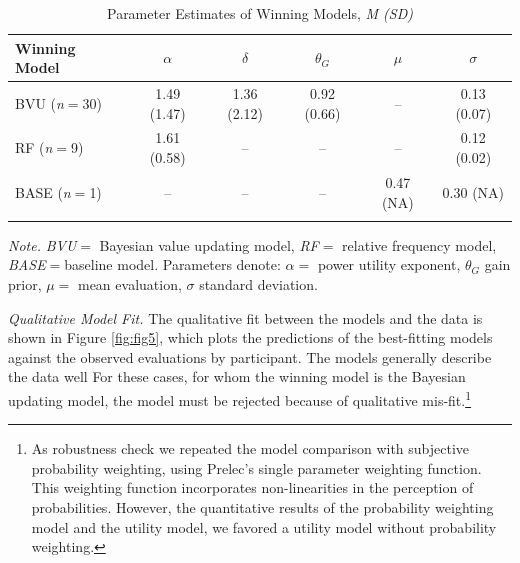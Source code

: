 \documentclass[a4paper, man, floatsintext]{apa6}
\let\rmarkdownfootnote\footnote%
\def\footnote{\protect\rmarkdownfootnote}
\begin{document}
\begin{table}[tbp]

\begin{center}
\begin{threeparttable}

\caption{\label{tab:study1_parameter}Parameter Estimates of Winning Models, \textit{M (SD)}}

\begin{tabular}{lccccc}
\toprule
Winning Model & $\alpha$ & $\delta$ & $\theta_G$ & $\mu$ & $\sigma$\\
\midrule
BVU (\textit{n}$=$30) & 1.49 (1.47) & 1.36 (2.12) & 0.92 (0.66) & -- & 0.13 (0.07)\\
RF (\textit{n}$=$9) & 1.61 (0.58) & -- & -- & -- & 0.12 (0.02)\\
BASE (\textit{n}$=$1) & -- & -- & -- & 0.47 (NA) & 0.30 (NA)\\
\bottomrule
\addlinespace
\end{tabular}

\begin{tablenotes}[para]
\normalsize{\textit{Note.} \textit{BVU}$=$ Bayesian value updating model, \textit{RF}$=$ relative frequency model, \textit{BASE}$=$baseline model. Parameters denote: $\alpha=$ power utility exponent, $\theta_G$ gain prior, $\mu=$ mean evaluation, $\sigma$ standard deviation.}
\end{tablenotes}

\end{threeparttable}
\end{center}

\end{table}

\textit{Qualitative Model Fit.} The qualitative fit between the models
and the data is shown in Figure \ref{fig:fig5}, which plots the
predictions of the best-fitting models against the observed evaluations
by participant. The models generally describe the data well
For these cases, for whom the winning model is the Bayesian updating
model, the model must be rejected because of qualitative
mis-fit.\footnote{As robustness check we repeated the model comparison with subjective probability weighting, using Prelec’s single parameter weighting function. This weighting function incorporates non-linearities in the perception of probabilities. However, the quantitative results of the probability weighting model and the utility model, we favored a utility model without probability weighting.}
\end{document}
